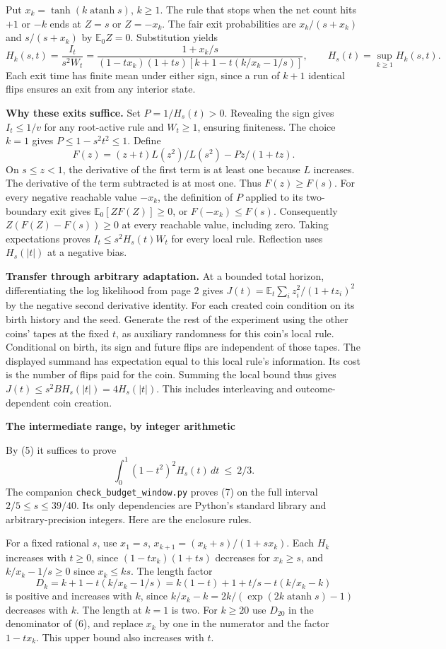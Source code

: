\documentclass[11pt]{article}
\newcommand{\E}{\mathbb E}
\newcommand{\atanh}{\operatorname{atanh}}
\newcommand{\heading}[1]{{\LARGE\bfseries\color{ink} #1}\par\smallskip}
\begin{document}
Put $x_k=\tanh(k\atanh s)$, $k\ge1$. The rule that stops when the net count hits $+1$ or $-k$ ends at $Z=s$ or $Z=-x_k$. The fair exit probabilities are $x_k/(s+x_k)$ and $s/(s+x_k)$ by $\E_0Z=0$. Substitution yields
\[
 H_k(s,t)=\frac{I_t}{s^2W_t}
 =\frac{1+x_k/s}
 {(1-tx_k)(1+ts)[k+1-t(k/x_k-1/s)]},\qquad
 H_s(t)=\sup_{k\ge1}H_k(s,t).                                 \tag{6}
\]
Each exit time has finite mean under either sign, since a run of $k+1$ identical flips ensures an exit from any interior state.

\textbf{Why these exits suffice.} Set $P=1/H_s(t)>0$. Revealing the sign gives $I_t\le1/v$ for any root-active rule and $W_t\ge1$, ensuring finiteness. The choice $k=1$ gives $P\le1-s^2t^2\le1$. Define
\[
 F(z)=(z+t)L(z^2)/L(s^2)-Pz/(1+tz).
\]
On $s\le z<1$, the derivative of the first term is at least one because $L$ increases. The derivative of the term subtracted is at most one. Thus $F(z)\ge F(s)$. For every negative reachable value $-x_k$, the definition of $P$ applied to its two-boundary exit gives $\E_0[Z F(Z)]\ge0$, or $F(-x_k)\le F(s)$. Consequently $Z(F(Z)-F(s))\ge0$ at every reachable value, including zero. Taking expectations proves $I_t\le s^2 H_s(t)W_t$ for every local rule. Reflection uses $H_s(|t|)$ at a negative bias.

\textbf{Transfer through arbitrary adaptation.} At a bounded total horizon, differentiating the log likelihood from page 2 gives $J(t)=\E_t\sum_i z_i^2/(1+t z_i)^2$ by the negative second derivative identity. For each created coin condition on its birth history and the seed. Generate the rest of the experiment using the other coins' tapes at the fixed $t$, as auxiliary randomness for this coin's local rule. Conditional on birth, its sign and future flips are independent of those tapes. The displayed summand has expectation equal to this local rule's information. Its cost is the number of flips paid for the coin. Summing the local bound thus gives $J(t)\le s^2B H_s(|t|)=4H_s(|t|)$. This includes interleaving and outcome-dependent coin creation.

\newpage
\heading{The intermediate range, by integer arithmetic}
By (5) it suffices to prove
\[
                   \int_0^1 (1-t^2)^2 H_s(t)\,dt\ \le\ 2/3 .
                   \tag{7}
\]
The companion \texttt{check\_budget\_window.py} proves (7) on the full interval $2/5\le s\le39/40$. Its only dependencies are Python's standard library and arbitrary-precision integers. Here are the enclosure rules.

For a fixed rational $s$, use $x_1=s$, $x_{k+1}=(x_k+s)/(1+sx_k)$. Each $H_k$ increases with $t\ge0$, since $(1-tx_k)(1+ts)$ decreases for $x_k\ge s$, and $k/x_k-1/s\ge0$ since $x_k\le ks$. The length factor
\[
 D_k=k+1-t(k/x_k-1/s)
     =k(1-t)+1+t/s-t(k/x_k-k)
\]
is positive and increases with $k$, since $k/x_k-k=2k/(\exp(2k\atanh s)-1)$ decreases with $k$. The length at $k=1$ is two. For $k\ge20$ use $D_{20}$ in the denominator of (6), and replace $x_k$ by one in the numerator and the factor $1-tx_k$. This upper bound also increases with $t$.
\end{document}
